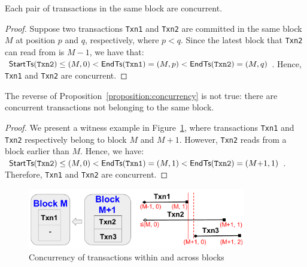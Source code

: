 {\begin{proposition}
  \label{proposition:concurrency}  
  Each pair of transactions in the same block are concurrent. 
\end{proposition} 

\begin{proof}
  Suppose two transactions \texttt{Txn1} and \texttt{Txn2} are committed in the
  same block $M$ at position $p$ and $q$, respectively, where $p < q$.
  Since the latest block that \texttt{Txn2} can read from is $M{-}1$, we have
  that: $\textsf{StartTs}(\texttt{Txn2}) \le (M,0) < \textsf{EndTs}(\texttt{Txn1}) = (M,p) < \textsf{EndTs}(\texttt{Txn2}) =
  (M,q)$.
  Hence, \texttt{Txn1} and \texttt{Txn2} are concurrent.
\end{proof}

\begin{proposition}
  \label{proposition:nonconcurrency}  
  The reverse of Proposition~\ref{proposition:concurrency} is not true: there are concurrent transactions not belonging to the same block.
\end{proposition} 

\begin{proof}
  We present a witness example in Figure~\ref{diagram:txn:theory_concurrency}, where
  transactions \texttt{Txn1} and \texttt{Txn2} respectively belong to block $M$
  and $M{+}1$. However, \texttt{Txn2} reads from a block earlier than $M$.
  Hence, we have: $\textsf{StartTs}(\texttt{Txn2}) \le (M,0) < \textsf{EndTs}(\texttt{Txn1}) = (M,1) <
  \textsf{EndTs}(\texttt{Txn2}) = (M{+}1,1)$.
  Therefore, \texttt{Txn1} and \texttt{Txn2} are concurrent.
\end{proof}

\begin{figure}[tp] \centering
  \includegraphics[width=0.85\textwidth]{diagram/txn/theory_concurrency.pdf}
  \caption{Concurrency of transactions within and across blocks}
  \label{diagram:txn:theory_concurrency}
\end{figure}

}
